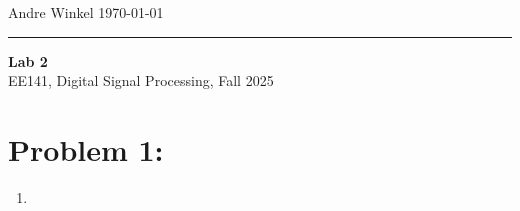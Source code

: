 \documentclass[11pt]{article}
\begin{document}
\noindent Andre Winkel \hfill \today \\
\rule{\textwidth}{0.4pt}

\begin{center} \large {\textbf{Lab 2}} \\[0em] {EE141, Digital Signal Processing, Fall 2025} \end{center}

\section{Problem 1: }
\begin{enumerate}[label=\textbf{\alph*)}, leftmargin=2.6em]
    \item 
\end{enumerate}
\end{document}
